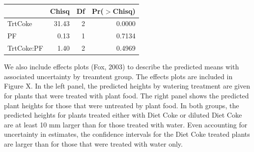 \documentclass[preprint,12pt]{elsarticle}\usepackage[]{graphicx}\usepackage[]{color}
\begin{document}
\begin{table}[ht]
\centering
\begin{tabular}{lrrr}
  \hline
 & Chisq & Df & Pr($>$Chisq) \\ 
  \hline
TrtCoke & 31.43 & 2 & 0.0000 \\ 
  PF & 0.13 & 1 & 0.7134 \\ 
  TrtCoke:PF & 1.40 & 2 & 0.4969 \\ 
   \hline
\end{tabular}
\end{table}
 

We also include effects plots (Fox, 2003) to describe the predicted means with associated uncertainty by treamtent group. The effects plots are included in Figure X. In the left panel, the predicted heights by watering treatment are given for plants that were treated with plant food. The right panel shows the predicted plant heights for those that were untreated by plant food. In both groups, the predicted heights for plants treated either with Diet Coke or diluted Diet Coke are at least 10 mm larger than for those treated with water. Even accounting for uncertainty in estimates, the confidence intervals for the Diet Coke treated plants are larger than for those that were treated with water only.  
\end{document}
